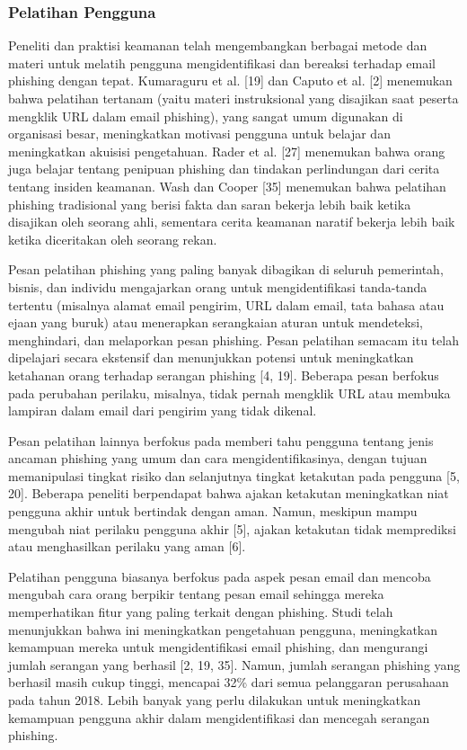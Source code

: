 \documentclass[lettersize,journal]{IEEEtran}
\begin{document}
\subsubsection{Pelatihan Pengguna}
Peneliti dan praktisi keamanan telah mengembangkan berbagai metode dan materi untuk melatih pengguna mengidentifikasi dan bereaksi terhadap email phishing dengan tepat. Kumaraguru et al. [19] dan Caputo et al. [2] menemukan bahwa pelatihan tertanam (yaitu materi instruksional yang disajikan saat peserta mengklik URL dalam email phishing), yang sangat umum digunakan di organisasi besar, meningkatkan motivasi pengguna untuk belajar dan meningkatkan akuisisi pengetahuan. Rader et al. [27] menemukan bahwa orang juga belajar tentang penipuan phishing dan tindakan perlindungan dari cerita tentang insiden keamanan. Wash dan Cooper [35] menemukan bahwa pelatihan phishing tradisional yang berisi fakta dan saran bekerja lebih baik ketika disajikan oleh seorang ahli, sementara cerita keamanan naratif bekerja lebih baik ketika diceritakan oleh seorang rekan.

Pesan pelatihan phishing yang paling banyak dibagikan di seluruh pemerintah, bisnis, dan individu mengajarkan orang untuk mengidentifikasi tanda-tanda tertentu (misalnya alamat email pengirim, URL dalam email, tata bahasa atau ejaan yang buruk) atau menerapkan serangkaian aturan untuk mendeteksi, menghindari, dan melaporkan pesan phishing. Pesan pelatihan semacam itu telah dipelajari secara ekstensif dan menunjukkan potensi untuk meningkatkan ketahanan orang terhadap serangan phishing [4, 19]. Beberapa pesan berfokus pada perubahan perilaku, misalnya, tidak pernah mengklik URL atau membuka lampiran dalam email dari pengirim yang tidak dikenal.

Pesan pelatihan lainnya berfokus pada memberi tahu pengguna tentang jenis ancaman phishing yang umum dan cara mengidentifikasinya, dengan tujuan memanipulasi tingkat risiko dan selanjutnya tingkat ketakutan pada pengguna [5, 20]. Beberapa peneliti berpendapat bahwa ajakan ketakutan meningkatkan niat pengguna akhir untuk bertindak dengan aman. Namun, meskipun mampu mengubah niat perilaku pengguna akhir [5], ajakan ketakutan tidak memprediksi atau menghasilkan perilaku yang aman [6].

Pelatihan pengguna biasanya berfokus pada aspek pesan email dan mencoba mengubah cara orang berpikir tentang pesan email sehingga mereka memperhatikan fitur yang paling terkait dengan phishing. Studi telah menunjukkan bahwa ini meningkatkan pengetahuan pengguna, meningkatkan kemampuan mereka untuk mengidentifikasi email phishing, dan mengurangi jumlah serangan yang berhasil [2, 19, 35]. Namun, jumlah serangan phishing yang berhasil masih cukup tinggi, mencapai 32\% dari semua pelanggaran perusahaan pada tahun 2018. Lebih banyak yang perlu dilakukan untuk meningkatkan kemampuan pengguna akhir dalam mengidentifikasi dan mencegah serangan phishing.
\end{document}
